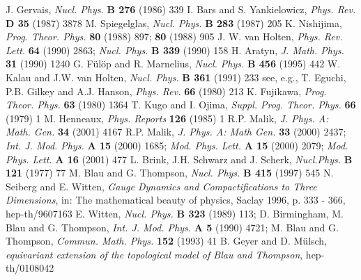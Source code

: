 \documentclass[a4paper,11pt]{article}
\begin{document}
\begin{thebibliography}{99}
\small{
 J. Gervais,
            {\it Nucl. Phys.} {\bf B 276} (1986) 339
 I. Bars and S. Yankielowicz,
            {\it Phys. Rev.} {\bf D 35} (1987) 3878 
 M. Spiegelglas,
            {\it Nucl. Phys.} {\bf B 283} (1987) 205
 K. Nishijima,
            {\it Prog. Theor. Phys.} {\bf 80} (1988) 897; 
            {\bf 80} (1988) 905
 J. W. van Holten, 
            {\it Phys. Rev. Lett.} {\bf 64} (1990) 2863;
            {\it Nucl. Phys.} {\bf B 339} (1990) 158   
 H. Aratyn,
            {\it J. Math. Phys.} {\bf 31} (1990) 1240
 G. F\"ul\"op and R. Marnelius,
            {\it Nucl. Phys.} {\bf B 456} (1995) 442
 W. Kalau and J.W. van Holten,
            {\it Nucl. Phys.} {\bf B 361} (1991) 233        
 see, e.g., T. Eguchi, P.B. Gilkey and A.J. Hanson,
            {\it Phys. Rev.} {\bf 66} (1980) 213
 K. Fujikawa,
             {\it Prog. Theor. Phys.} {\bf 63} (1980) 1364
 T. Kugo and I. Ojima,
             {\it Suppl. Prog. Theor. Phys.} {\bf 66} (1979) 1 
 M. Henneaux,
             {\it Phys. Reports} {\bf 126} (1985) 1
 R.P. Malik,
             {\it J. Phys. A: Math. Gen.} {\bf 34} (2001) 4167
 R.P. Malik,
             {\it J. Phys. A: Math Gen.} {\bf 33} (2000) 2437;
             {\it Int. J. Mod. Phys.} {\bf A 15} (2000) 1685;
             {\it Mod. Phys. Lett.} {\bf A 15} (2000) 2079; 
             {\it Mod. Phys. Lett.} {\bf A 16} (2001) 477
 L. Brink, J.H. Schwarz and J. Scherk,
             {\it Nucl.Phys.} {\bf B 121} (1977) 77
 M. Blau and G. Thompson, 
             {\it Nucl. Phys.} {\bf B 415} (1997) 545
 N. Seiberg and E. Witten,
             {\it Gauge Dynamics and Compactifications to Three Dimensions},
             in: {\sf The mathematical beauty of physics}, Saclay 1996, 
	     p. 333 - 366, hep-th/9607163
 E. Witten,
             {\it Nucl. Phys.} {\bf B 323} (1989) 113;
             D. Birmingham, M. Blau and G. Thompson,
             {\it Int. J. Mod. Phys.} {\bf A 5} (1990) 4721;
             M. Blau and G. Thompson,
             {\it Commun. Math. Phys.} {\bf 152} (1993) 41                 
 B. Geyer and D. M\"ulsch, 
             {\it {}\coordHE{} equivariant extension of the \coordHE{} topological
             model of Blau and Thompson}, hep-th/0108042
}
\end{thebibliography} 
\end{document}
